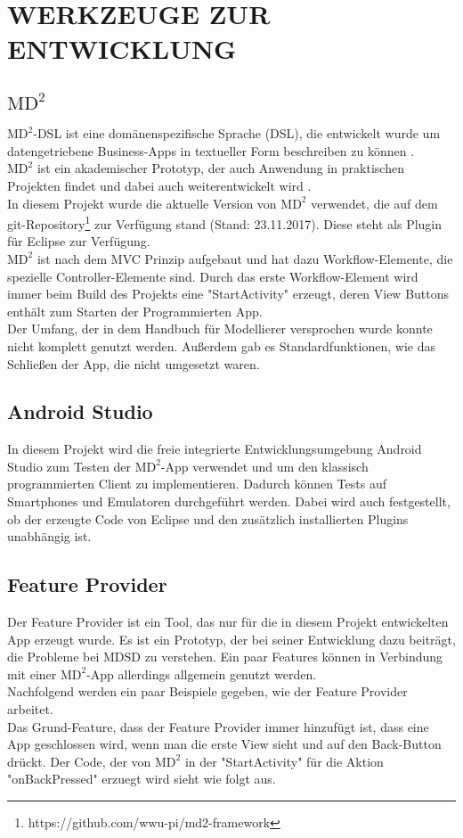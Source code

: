 \section{\uppercase{Werkzeuge zur Entwicklung}}
	
	\subsection{$\text{MD}^2$}
	$\text{MD}^2$-DSL ist eine dom\"anenspezifische Sprache (DSL), die entwickelt wurde um datengetriebene Business-Apps in textueller Form beschreiben zu k\"onnen \cite{DSLMD2_2013}.\\
	$\text{MD}^2$ ist ein akademischer Prototyp, der auch Anwendung in praktischen Projekten findet und dabei auch weiterentwickelt wird \cite{MDCP2015}.\\
	In diesem Projekt wurde die aktuelle Version von $\text{MD}^2$ verwendet, die auf dem git-Repository\footnote{https://github.com/wwu-pi/md2-framework} zur Verf\"ugung stand (Stand: 23.11.2017). Diese steht als Plugin f\"ur Eclipse zur Verf\"ugung.\\
	$\text{MD}^2$ ist nach dem MVC Prinzip aufgebaut und hat dazu Workflow-Elemente, die spezielle Controller-Elemente sind\cite{Handbookmd2}. Durch das erste Workflow-Element wird immer beim Build des Projekts eine "StartActivity" erzeugt, deren View Buttons enth\"alt zum Starten der Programmierten App.\\
	Der Umfang, der in dem Handbuch f\"ur Modellierer versprochen wurde konnte nicht komplett genutzt werden. Au\ss{}erdem gab es Standardfunktionen, wie das Schlie\ss{}en der App, die nicht umgesetzt waren.
	
	\subsection{Android Studio}
	In diesem Projekt wird die freie integrierte Entwicklungsumgebung Android Studio zum Testen der $\text{MD}^2$-App verwendet und um den klassisch programmierten Client zu implementieren. Dadurch k\"onnen Tests auf Smartphones und Emulatoren durchgef\"uhrt werden. Dabei wird auch festgestellt, ob der erzeugte Code von Eclipse und den zus\"atzlich installierten Plugins unabh\"angig ist.

	\subsection{Feature Provider}
	Der Feature Provider ist ein Tool, das nur f\"ur die in diesem Projekt entwickelten App erzeugt wurde. Es ist ein Prototyp, der bei seiner Entwicklung dazu beitr\"agt, die Probleme bei MDSD zu verstehen. Ein paar Features k\"onnen in Verbindung mit einer $\text{MD}^2$-App allerdings allgemein genutzt werden.\\
	Nachfolgend werden ein paar Beispiele gegeben, wie der Feature Provider arbeitet.\\
	Das Grund-Feature, dass der Feature Provider immer hinzuf\"ugt ist, dass eine App geschlossen wird, wenn man die erste View sieht und auf den Back-Button dr\"uckt. Der Code, der von $\text{MD}^2$ in der "StartActivity" f\"ur die Aktion "onBackPressed" erzuegt wird sieht wie folgt aus.
	
